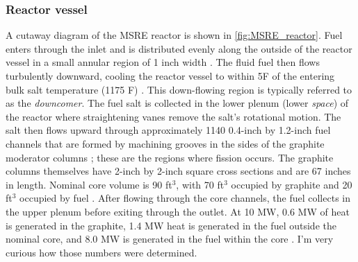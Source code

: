 \documentclass{article}
\let\Oldsubsubsection\subsubsection
\renewcommand{\subsubsection}{\FloatBarrier\Oldsubsubsection}
\begin{document}
\subsubsection{Reactor vessel}
\label{sec:reactor}

A cutaway diagram of the \gls{MSRE} reactor is shown in
\cref{fig:MSRE_reactor}. Fuel enters through the inlet and is distributed evenly
along the outside of the reactor vessel in a small annular region of 1 inch
width \cite{robertson_msre_1965}. The fluid fuel then flows turbulently
downward, cooling the reactor vessel to within 5\textdegree F of the entering
bulk salt temperature (1175 \textdegree F) \cite{robertson_msre_1965}. This
down-flowing region is typically referred to as the \textit{downcomer}. The fuel
salt is collected in the lower plenum (lower \textit{space}) of the reactor
where straightening vanes remove the salt's rotational motion. The salt then
flows upward through approximately 1140 0.4-inch by 1.2-inch fuel channels that
are formed by machining grooves in the sides of the graphite moderator columns
\cite{robertson_msre_1965}; these are the regions where fission occurs.  The
graphite columns themselves have 2-inch by 2-inch square cross sections and are
67 inches in length. Nominal core volume is 90 ft$^3$, with 70 ft$^3$ occupied
by graphite and 20 ft$^3$ occupied by fuel \cite{robertson_msre_1965}.  After
flowing through the core channels, the fuel collects in the upper plenum before
exiting through the outlet. At 10 MW, 0.6 MW of heat is generated in the
graphite, 1.4 MW heat is generated in the fuel outside the nominal core, and 8.0
MW is generated in the fuel within the core \cite{robertson_msre_1965}. I'm very
curious how those numbers were determined.
\end{document}
